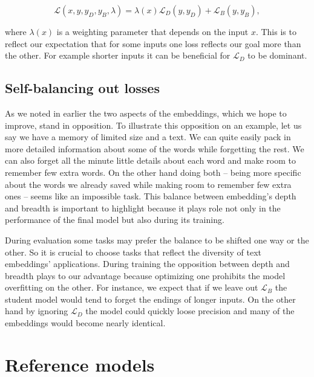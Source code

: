 \begin{equation}
  \mathcal{L}(x, y, y_D, y_B, \lambda) =
    \lambda(x) \mathcal{L}_D(y, y_D) +
            \mathcal{L}_B(y, y_B),
\end{equation}

where $\lambda(x)$ is a weighting parameter that depends on the input $x$. This
is to reflect our expectation that for some inputs one loss reflects our goal
more than the other. For example shorter inputs it can be beneficial for
$\mathcal{L}_D$ to be dominant.

\subsection{Self-balancing out losses}

As we noted in earlier the two aspects of the embeddings, which we hope to
improve, stand in opposition. To illustrate this opposition on an example, let
us say we have a memory of limited size and a text. We can quite easily pack in
more detailed information about some of the words while forgetting the rest. We
can also forget all the minute little details about each word and make room to
remember few extra words. On the other hand doing both -- being more specific
about the words we already saved while making room to remember few extra ones --
seems like an impossible task. This balance between embedding's depth and
breadth is important to highlight because it plays role not only in the
performance of the final model but also during its training.

During evaluation some tasks may prefer the balance to be shifted one way or the
other. So it is crucial to choose tasks that reflect the diversity of text
embeddings' applications. During training the opposition between depth and
breadth plays to our advantage because optimizing one prohibits the model
overfitting on the other. For instance, we expect that if we leave out
$\mathcal{L}_B$ the student model would tend to forget the endings of longer
inputs. On the other hand by ignoring $\mathcal{L}_D$ the model could quickly
loose precision and many of the embeddings would become nearly identical.

\section{Reference models}


